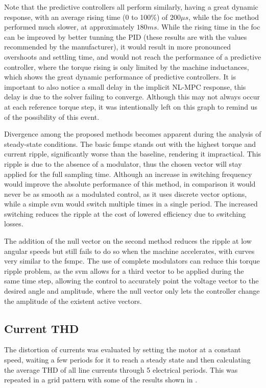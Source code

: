 Note that the predictive controllers all perform similarly, having a great dynamic response, with an average rising time (0 to 100\%) of $200\mu s$, while the \gls{foc} method performed much slower, at approximately $180ms$. While the rising time in the \gls{foc} can be improved by better tunning the PID (these results are with the values recommended by the manufacturer), it would result in more pronounced overshoots and settling time, and would not reach the performance of a predictive controller, where the torque rising is only limited by the machine inductances, which shows the great dynamic performance of predictive controllers. It is important to also notice a small delay in the implicit NL-MPC response, this delay is due to the solver failing to converge. Although this may not always occur at each reference torque step, it was intentionally left on this graph to remind us of the possibility of this event. 

Divergence among the proposed methods becomes apparent during the analysis of steady-state conditions. The basic \gls{fsmpc} stands out with the highest torque and current ripple, significantly worse than the baseline, rendering it impractical. This ripple is due to the absence of a modulator, thus the chosen vector will stay applied for the full sampling time. Although an increase in switching frequency would improve the absolute performance of this method, in comparison it would never be as smooth as a modulated control, as it uses discrete vector options, while a simple \gls{svm} would switch multiple times in a single period. The increased switching reduces the ripple at the cost of lowered efficiency due to switching losses.

The addition of the null vector on the second method reduces the ripple at low angular speeds but still fails to do so when the machine accelerates, with curves very similar to the \gls{fsmpc}. The use of complete modulators can reduce this torque ripple problem, as the \gls{svm} allows for a third vector to be applied during the same time step, allowing the control to accurately point the voltage vector to the desired angle and amplitude, where the null vector only lets the controller change the amplitude of the existent active vectors.
\subsection{Current THD}

The distortion of currents was evaluated by setting the motor at a constant speed, waiting a few periods for it to reach a steady state and then calculating the average THD of all line currents through 5 electrical periods. This was repeated in a grid pattern with some of the results shown in .

